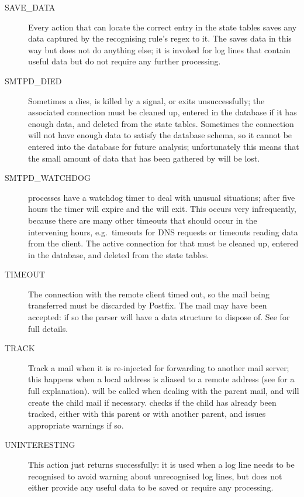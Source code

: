 \begin{description}
    \item [SAVE\_DATA] Every action that can locate the correct entry in
        the state tables saves any data captured by the recognising rule's
        regex to it.  The  saves data in this way but
        does not do anything else; it is invoked for log lines that contain
        useful data but do not require any further processing.

    \item [SMTPD\_DIED] Sometimes a  dies, is killed by a
        signal, or exits unsuccessfully; the associated connection must be
        cleaned up, entered in the database if it has enough data, and
        deleted from the state tables.  Sometimes the connection will not
        have enough data to satisfy the database schema, so it cannot be
        entered into the database for future analysis; unfortunately this
        means that the small amount of data that has been gathered by
        \parsername{} will be lost.

    \item [SMTPD\_WATCHDOG]  processes have a watchdog timer
        to deal with unusual situations; after five hours the timer will
        expire and the  will exit.  This occurs very
        infrequently, because there are many other timeouts that should
        occur in the intervening hours, e.g.\ timeouts for DNS requests or
        timeouts reading data from the client.  The active connection for
        that  must be cleaned up, entered in the database,
        and deleted from the state tables.

    \item [TIMEOUT] The connection with the remote client timed out, so the
        mail being transferred must be discarded by Postfix.  The mail may
        have been accepted: if so the parser will have a data structure to
        dispose of.  See  for full
        details.

    \item [TRACK] Track a mail when it is re-injected for forwarding to
        another mail server; this happens when a local address is aliased
        to a remote address (see  for
        a full explanation).   will be called when dealing
        with the parent mail, and will create the child mail if necessary.
         checks if the child has already been tracked, either
        with this parent or with another parent, and issues appropriate
        warnings if so.

    \item [UNINTERESTING] This action just returns successfully: it is used
        when a log line needs to be recognised to avoid warning about
        unrecognised log lines, but does not either provide any useful data
        to be saved or require any processing.

\end{description}


